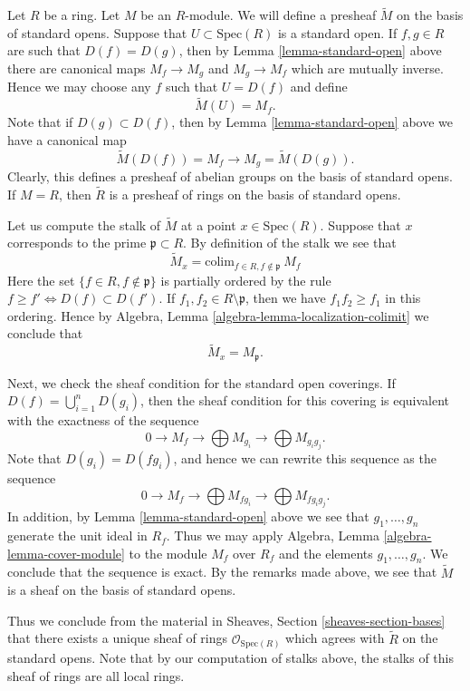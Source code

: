 \noindent
Let $R$ be a ring. Let $M$ be an $R$-module. We will define
a presheaf $\widetilde M$ on the basis of standard opens.
Suppose that $U \subset \text{Spec}(R)$ is a standard open.
If $f, g \in R$ are such that $D(f) = D(g)$, then
by Lemma \ref{lemma-standard-open} above there are canonical
maps $M_f \to M_g$ and $M_g \to M_f$ which are mutually inverse.
Hence we may choose any $f$ such that $U = D(f)$
and define
$$
\widetilde M(U) = M_f.
$$
Note that if $D(g) \subset D(f)$, then by
Lemma \ref{lemma-standard-open} above we have
a canonical map
$$
\widetilde M(D(f)) = M_f \longrightarrow M_g = \widetilde M(D(g)).
$$
Clearly, this defines a presheaf of abelian groups on the basis
of standard opens. If $M = R$, then $\widetilde R$ is a presheaf
of rings on the basis of standard opens.

\medskip\noindent
Let us compute the stalk of $\widetilde M$ at a point $x \in \text{Spec}(R)$.
Suppose that $x$ corresponds to the prime $\mathfrak p \subset R$.
By definition of the stalk we see that
$$
\widetilde M_x = \text{colim}_{f\in R, f\not\in \mathfrak p}\ M_f
$$
Here the set $\{f\in R, f\not\in \mathfrak p\}$ is partially
ordered by the rule $f \geq f' \Leftrightarrow D(f) \subset D(f')$.
If $f_1, f_2 \in R \setminus \mathfrak p$, then we have
$f_1f_2 \geq f_1$ in this ordering. Hence by
Algebra, Lemma \ref{algebra-lemma-localization-colimit}
we conclude that
$$
\widetilde M_x = M_{\mathfrak p}.
$$

\medskip\noindent
Next, we check the sheaf condition for the standard open coverings.
If $D(f) = \bigcup_{i=1}^n D(g_i)$, then the sheaf condition
for this covering is equivalent with the exactness of the
sequence
$$
0 \to M_f \to \bigoplus M_{g_i} \to \bigoplus M_{g_ig_j}.
$$
Note that $D(g_i) = D(fg_i)$, and hence we can rewrite this
sequence as the sequence
$$
0 \to M_f \to \bigoplus M_{fg_i} \to \bigoplus M_{fg_ig_j}.
$$
In addition, by Lemma \ref{lemma-standard-open} above
we see that $g_1,\ldots,g_n$ generate the unit ideal
in $R_f$. Thus we may apply
Algebra, Lemma \ref{algebra-lemma-cover-module}
to the module $M_f$ over $R_f$ and the elements $g_1,\ldots,g_n$.
We conclude that the sequence is exact. By the remarks
made above, we see that $\widetilde M$ is a sheaf
on the basis of standard opens.

\medskip\noindent
Thus we conclude from the material in
Sheaves, Section \ref{sheaves-section-bases}
that there exists a
unique sheaf of rings $\mathcal{O}_{\text{Spec}(R)}$
which agrees with $\widetilde R$ on the standard opens.
Note that by our computation of stalks above, the
stalks of this sheaf of rings are all local rings.

